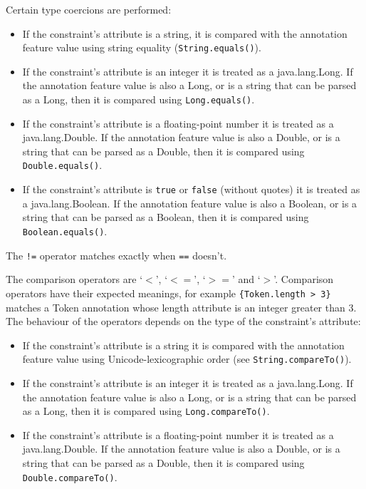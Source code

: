 Certain type coercions are performed:
\begin{itemize}
\item If the constraint's attribute is a string, it is compared with the
      annotation feature value using string equality (\verb|String.equals()|).
\item If the constraint's attribute is an integer it is treated as a
      java.lang.Long.  If the annotation feature value is also a Long, or is a
      string that can be parsed as a Long, then it is compared using
      \verb|Long.equals()|.
\item If the constraint's attribute is a floating-point number it is treated as
      a java.lang.Double.  If the annotation feature value is also a Double, or
      is a string that can be parsed as a Double, then it is compared using
      \verb|Double.equals()|.
\item If the constraint's attribute is \verb|true| or \verb|false| (without
      quotes) it is treated as a java.lang.Boolean.  If the annotation feature
      value is also a Boolean, or is a string that can be parsed as a Boolean,
      then it is compared using \verb|Boolean.equals()|.
\end{itemize}

The \verb|!=| operator matches exactly when \verb|==| doesn't.


The comparison operators are `$<$', `$<=$', `$>=$' and `$>$'. Comparison
operators have their expected meanings, for example \verb|{Token.length > 3}|
matches a Token annotation whose length attribute is an integer greater than 3.
The behaviour of the operators depends on the type of the constraint's attribute:

\begin{itemize}
\item If the constraint's attribute is a string it is compared with the
      annotation feature value using Unicode-lexicographic order (see
      \verb|String.compareTo()|).
\item If the constraint's attribute is an integer it is treated as a
      java.lang.Long.  If the annotation feature value is also a Long, or is a
      string that can be parsed as a Long, then it is compared using
      \verb|Long.compareTo()|.
\item If the constraint's attribute is a floating-point number it is treated as
      a java.lang.Double.  If the annotation feature value is also a Double, or
      is a string that can be parsed as a Double, then it is compared using
      \verb|Double.compareTo()|.
\end{itemize}


